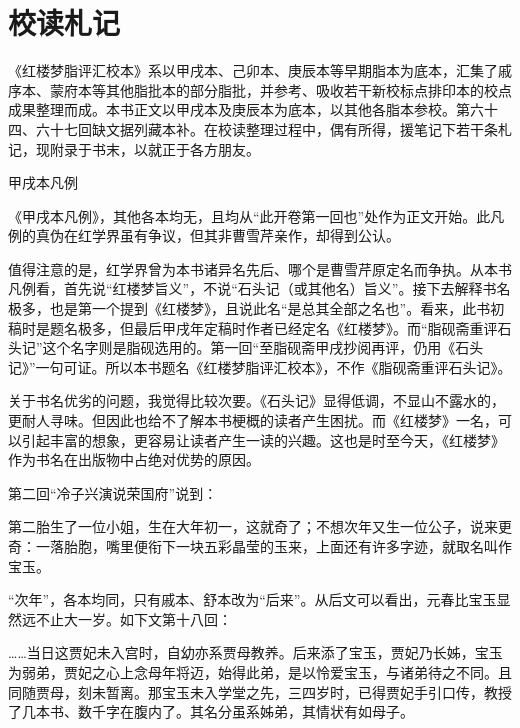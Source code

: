 
\chapter{校读札记}

《红楼梦脂评汇校本》系以甲戌本、己卯本、庚辰本等早期脂本为底本，汇集了戚序本、蒙府本等其他脂批本的部分脂批，并参考、吸收若干新校标点排印本的校点成果整理而成。本书正文以甲戌本及庚辰本为底本，以其他各脂本参校。第六十四、六十七回缺文据列藏本补。在校读整理过程中，偶有所得，援笔记下若干条札记，现附录于书末，以就正于各方朋友。

{\begin{center}
	\kaishu \LARGE 	甲戌本凡例
\end{center}}

《甲戌本凡例》，其他各本均无，且均从``此开卷第一回也''处作为正文开始。此凡例的真伪在红学界虽有争议，但其非曹雪芹亲作，却得到公认。

值得注意的是，红学界曾为本书诸异名先后、哪个是曹雪芹原定名而争执。从本书凡例看，首先说``红楼梦旨义''，不说``石头记（或其他名）旨义''。接下去解释书名极多，也是第一个提到《红楼梦》，且说此名``是总其全部之名也''。看来，此书初稿时是题名极多，但最后甲戌年定稿时作者已经定名《红楼梦》。而``脂砚斋重评石头记''这个名字则是脂砚选用的。第一回``至脂砚斋甲戌抄阅再评，仍用《石头记》''一句可证。所以本书题名《红楼梦脂评汇校本》，不作《脂砚斋重评石头记》。

关于书名优劣的问题，我觉得比较次要。《石头记》显得低调，不显山不露水的，更耐人寻味。但因此也给不了解本书梗概的读者产生困扰。而《红楼梦》一名，可以引起丰富的想象，更容易让读者产生一读的兴趣。这也是时至今天，《红楼梦》作为书名在出版物中占绝对优势的原因。

{{}}

第二回``冷子兴演说荣国府''说到：

第二胎生了一位小姐，生在大年初一，这就奇了；不想次年又生一位公子，说来更奇：一落胎胞，嘴里便衔下一块五彩晶莹的玉来，上面还有许多字迹，就取名叫作宝玉。

``次年''，各本均同，只有戚本、舒本改为``后来''。从后文可以看出，元春比宝玉显然远不止大一岁。如下文第十八回：

\ldots{}\ldots{}当日这贾妃未入宫时，自幼亦系贾母教养。后来添了宝玉，贾妃乃长姊，宝玉为弱弟，贾妃之心上念母年将迈，始得此弟，是以怜爱宝玉，与诸弟待之不同。且同随贾母，刻未暂离。那宝玉未入学堂之先，三四岁时，已得贾妃手引口传，教授了几本书、数千字在腹内了。其名分虽系姊弟，其情状有如母子。

